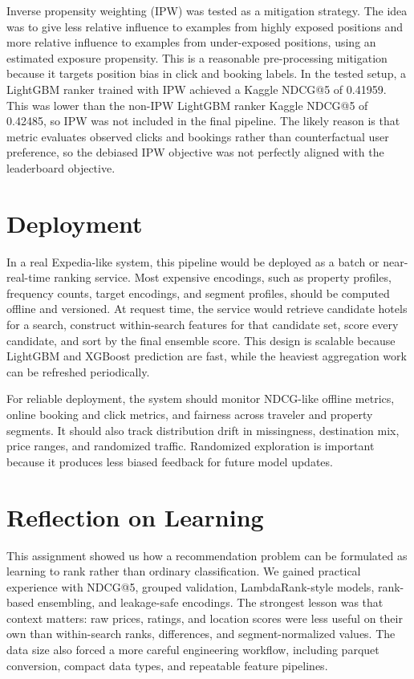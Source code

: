 \documentclass[runningheads]{llncs}
\begin{document}
Inverse propensity weighting (IPW) was tested as a mitigation strategy.  The idea was to give less relative influence to examples from highly exposed positions and more relative influence to examples from under-exposed positions, using an estimated exposure propensity.  This is a reasonable pre-processing mitigation because it targets position bias in click and booking labels. In the tested setup, a LightGBM ranker trained with IPW achieved a Kaggle NDCG@5 of 0.41959. This was lower than the non-IPW LightGBM ranker Kaggle NDCG@5 of 0.42485, so IPW was not included in the final pipeline. The likely reason is that metric evaluates observed clicks and bookings rather than counterfactual user preference, so the debiased IPW objective was not perfectly aligned with the leaderboard objective.

\section{Deployment}

In a real Expedia-like system, this pipeline would be deployed as a batch or near-real-time ranking service.  Most expensive encodings, such as property profiles, frequency counts, target encodings, and segment profiles, should be computed offline and versioned.  At request time, the service would retrieve candidate hotels for a search, construct within-search features for that candidate set, score every candidate, and sort by the final ensemble score.  This design is scalable because LightGBM and XGBoost prediction are fast, while the heaviest aggregation work can be refreshed periodically.

For reliable deployment, the system should monitor NDCG-like offline metrics, online booking and click metrics, and fairness across traveler and property segments.  It should also track distribution drift in missingness, destination mix, price ranges, and randomized traffic.  Randomized exploration is important because it produces less biased feedback for future model updates.

\section{Reflection on Learning}

This assignment showed us how a recommendation problem can be formulated as learning to rank rather than ordinary classification.  We gained practical experience with NDCG@5, grouped validation, LambdaRank-style models, rank-based ensembling, and leakage-safe encodings.  The strongest lesson was that context matters: raw prices, ratings, and location scores were less useful on their own than within-search ranks, differences, and segment-normalized values.  The data size also forced a more careful engineering workflow, including parquet conversion, compact data types, and repeatable feature pipelines.
\end{document}

